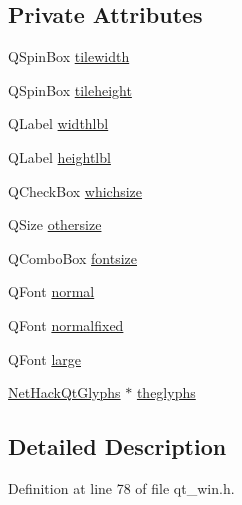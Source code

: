 \subsection*{Private Attributes}
\begin{DoxyCompactItemize}
\item 
Q\+Spin\+Box \hyperlink{classNetHackQtSettings_a0407cbea95ad807c98ca7bd9c7913400}{tilewidth}
\item 
Q\+Spin\+Box \hyperlink{classNetHackQtSettings_ab55954c702c1f9e3e912c9a5c763a098}{tileheight}
\item 
Q\+Label \hyperlink{classNetHackQtSettings_a378b10ecfb03608b7a59c5f1b53648e8}{widthlbl}
\item 
Q\+Label \hyperlink{classNetHackQtSettings_a38f6e57a9551668dbd46219407e697d9}{heightlbl}
\item 
Q\+Check\+Box \hyperlink{classNetHackQtSettings_ac761d5961ac831001e4f68cbe2b75265}{whichsize}
\item 
Q\+Size \hyperlink{classNetHackQtSettings_a875bdf452d69d2dda5c785808538c817}{othersize}
\item 
Q\+Combo\+Box \hyperlink{classNetHackQtSettings_abe20d1974c3247b04d1b2d755b92e945}{fontsize}
\item 
Q\+Font \hyperlink{classNetHackQtSettings_a86df56bfe2cd97a6d45a8d3325334111}{normal}
\item 
Q\+Font \hyperlink{classNetHackQtSettings_aa5aa4bec82f3db5187cfb7bd8549c020}{normalfixed}
\item 
Q\+Font \hyperlink{classNetHackQtSettings_acac51e1ea0e554eb2dbe6eecf783d07e}{large}
\item 
\hyperlink{classNetHackQtGlyphs}{Net\+Hack\+Qt\+Glyphs} $\ast$ \hyperlink{classNetHackQtSettings_a5f266d486269b67477007a4a848922a5}{theglyphs}
\end{DoxyCompactItemize}


\subsection{Detailed Description}


Definition at line 78 of file qt\+\_\+win.\+h.



